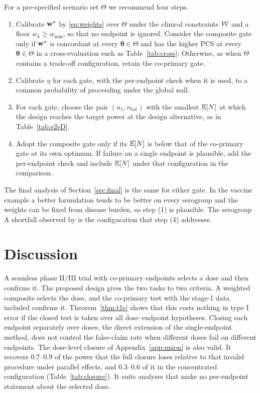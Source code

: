 For a pre-specified scenario set $\Theta$ we recommend four steps.
\begin{enumerate}[label=(\arabic*),leftmargin=*]
\item Calibrate $\mathbf{w}^\star$ by \eqref{eq:weights} over $\Theta$ under the clinical constraints $\mathcal{W}$ and a floor $w_k\ge w_{\min}$, so that no endpoint is ignored. Consider the composite gate only if $\mathbf{w}^\star$ is concordant at every $\bm\theta\in\Theta$ and has the higher PCS at every $\bm\theta\in\Theta$ in a cross-evaluation such as Table~\ref{tab:cross}. Otherwise, as when $\Theta$ contains a trade-off configuration, retain the co-primary gate.
\item Calibrate $\eta$ for each gate, with the per-endpoint check when it is used, to a common probability of proceeding under the global null.
\item For each gate, choose the pair $(n_1,n_{\mathrm{tot}})$ with the smallest $\mathbb{E}[N]$ at which the design reaches the target power at the design alternative, as in Table~\ref{tab:e2eD}.
\item Adopt the composite gate only if its $\mathbb{E}[N]$ is below that of the co-primary gate at its own optimum. If failure on a single endpoint is plausible, add the per-endpoint check and include $\mathbb{E}[N]$ under that configuration in the comparison.
\end{enumerate}
The final analysis of Section~\ref{sec:final} is the same for either gate. In the vaccine example a better formulation tends to be better on every serogroup and the weights can be fixed from disease burden, so step (1) is plausible. The serogroup A shortfall observed by \citet{ostergaard2009} is the configuration that step (4) addresses.

\section{Discussion}\label{sec:disc}

A seamless phase II/III trial with co-primary endpoints selects a dose and then confirms it. The proposed design gives the two tasks to two criteria. A weighted composite selects the dose, and the co-primary test with the stage-1 data included confirms it. Theorem~\ref{thm:t1e} shows that this costs nothing in type I error if the closed test is taken over all dose--endpoint hypotheses. Closing each endpoint separately over doses, the direct extension of the single-endpoint method, does not control the false-claim rate when different doses fail on different endpoints. The dose-level closure of Appendix~\ref{app:union} is also valid. It recovers $0.7$--$0.9$ of the power that the full closure loses relative to that invalid procedure under parallel effects, and $0.3$--$0.6$ of it in the concentrated configuration (Table~\ref{tab:closure}). It suits analyses that make no per-endpoint statement about the selected dose.

